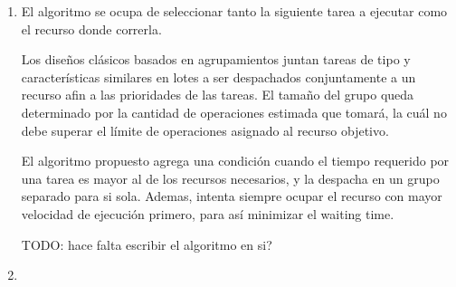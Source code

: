 \begin{enumerate}[label=\alph*)]

    \item El algoritmo se ocupa de seleccionar tanto
        la siguiente tarea a ejecutar como el recurso donde correrla.

        Los diseños clásicos basados en agrupamientos juntan tareas de tipo
        y características similares en lotes a ser despachados conjuntamente
        a un recurso afin a las prioridades de las tareas.
        El tamaño del grupo queda determinado por la cantidad de operaciones
        estimada que tomará, la cuál no debe superar el límite de operaciones
        asignado al recurso objetivo.

        El algoritmo propuesto agrega una condición cuando el tiempo requerido
        por una tarea es mayor al de los recursos necesarios, y la despacha
        en un grupo separado para si sola. Ademas, intenta siempre ocupar
        el recurso con mayor velocidad de ejecución primero, para así minimizar
        el waiting time.

        TODO: hace falta escribir el algoritmo en si?

    \item

\end{enumerate}

